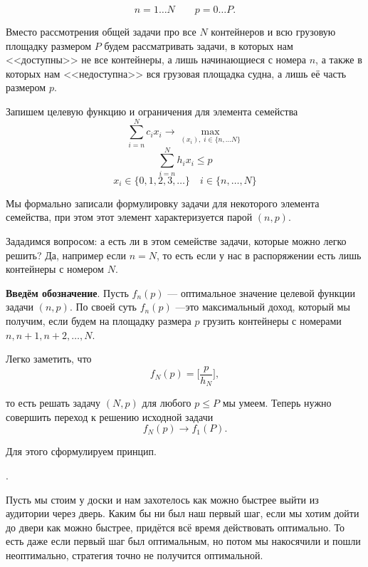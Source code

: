 \[
n = 1 \dots N \qquad p = 0 \dots P.
\]

Вместо рассмотрения общей задачи про все $N$ контейнеров и всю грузовую площадку размером $P$ будем рассматривать задачи, в которых нам <<доступны>> не все контейнеры, а лишь начинающиеся с номера $n$, а также в которых нам <<недоступна>> вся грузовая площадка судна, а лишь её часть размером $p$.

Запишем целевую функцию и ограничения для элемента семейства
\[
\sum_{i=n}^{N} c_i x_i \to \max_{(x_i), \; i \in \{n, \dots N\}}
\]
\[
\sum_{i=n}^{N} h_i x_i \le p
\]
\[
x_i \in \{0, 1, 2, 3, \dots\} \quad i \in \{n, \dots, N\}
\]

Мы формально записали формулировку задачи для некоторого элемента семейства, при этом этот элемент характеризуется парой $(n, p)$.

Зададимся вопросом: а есть ли в этом семействе задачи, которые можно легко решить? Да, например если $n = N$, то есть если у нас в распоряжении есть лишь контейнеры с номером $N$.

\textbf{Введём обозначение}. Пусть $\boxed{f_n(p)}$ --- оптимальное значение целевой функции задачи $(n, p)$. По своей суть $f_n(p)$ ---это максимальный доход, который мы получим, если будем на площадку размера $p$ грузить контейнеры с номерами $n, n+1, n+2, \dots, N$.

Легко заметить, что
\[
f_N(p) = \bigg[\frac{p}{h_N}\bigg],
\]

то есть решать задачу $(N, p)$ для любого $p \le P$ мы умеем. Теперь нужно совершить переход к решению исходной задачи
\[
f_N(p) \longrightarrow f_1(P).
\]

Для этого сформулируем принцип.


.

\example

Пусть мы стоим у доски и нам захотелось как можно быстрее выйти из аудитории через дверь. Каким бы ни был наш первый шаг, если мы хотим дойти до двери как можно быстрее, придётся всё время действовать оптимально. То есть даже если первый шаг был оптимальным, но потом мы накосячили и пошли неоптимально, стратегия точно не получится оптимальной.

\bigskip

